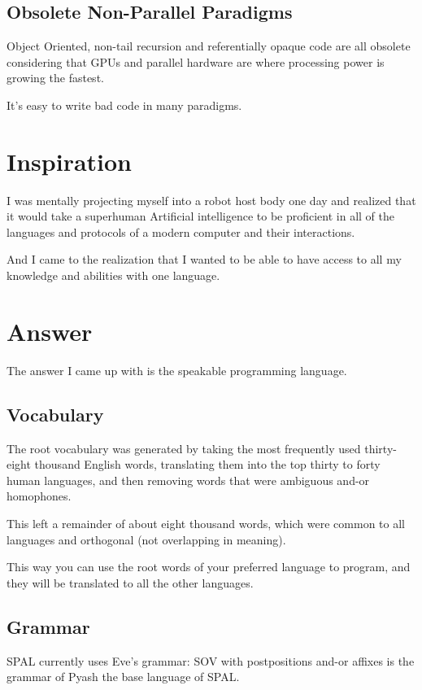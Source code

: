 \begin{multicols}{2}
\subsection{Obsolete Non-Parallel Paradigms}
Object Oriented, non-tail recursion and referentially opaque code are all
obsolete considering that GPUs and parallel hardware are where processing power
is growing the fastest.

It's easy to write bad code in many paradigms.

\section{Inspiration}
I was mentally projecting myself into a robot host body one day and realized
that it would take a superhuman Artificial intelligence to be proficient in all 
of the languages and protocols of a modern computer and their interactions.

And I came to the realization that I wanted to be able to have access to all my
knowledge and abilities with one language. 


\section{Answer}

The answer I came up with is the speakable programming language.

\subsection{Vocabulary}

The root vocabulary was generated by taking the most frequently used
thirty-eight thousand English words, translating them into the top thirty to
forty human languages, and then removing words that were ambiguous and-or
homophones.

This left a remainder of about eight thousand words, which were common to all
languages and orthogonal (not overlapping in meaning). 

This way you can use the root words of your preferred language to program, and
they will be translated to all the other languages. 

\subsection{Grammar}
SPAL currently uses Eve's grammar:
 SOV with postpositions and-or affixes is the grammar of Pyash 
the base language of SPAL.\@


\end{multicols}
